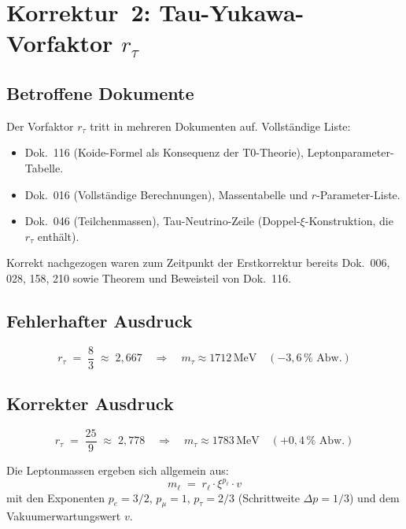 \section{\texorpdfstring{Korrektur~2: Tau-Yukawa-Vorfaktor $r_\tau$}{Korrektur 2: Tau-Yukawa-Vorfaktor r-tau}}

\subsection*{Betroffene Dokumente}

Der Vorfaktor $r_\tau$ tritt in mehreren Dokumenten auf. Vollständige Liste:
\begin{itemize}
  \item Dok.~116 (Koide-Formel als Konsequenz der T0-Theorie),
        Leptonparameter-Tabelle.
  \item Dok.~016 (Vollständige Berechnungen), Massentabelle und
        $r$-Parameter-Liste.
  \item Dok.~046 (Teilchenmassen), Tau-Neutrino-Zeile
        (Doppel-$\xi$-Konstruktion, die $r_\tau$ enthält).
\end{itemize}
Korrekt nachgezogen waren zum Zeitpunkt der Erstkorrektur bereits
Dok.~006, 028, 158, 210 sowie Theorem und Beweisteil von Dok.~116.

\subsection*{Fehlerhafter Ausdruck}

\begin{equation}
  r_\tau \;=\; \frac{8}{3} \;\approx\; 2{,}667
  \quad \Rightarrow \quad
  m_\tau \approx 1712\,\text{MeV} \quad (-3{,}6\,\% \text{ Abw.})
  \tag{alt -- falsch}
\end{equation}

\subsection*{Korrekter Ausdruck}

\begin{equation}
  \boxed{r_\tau \;=\; \frac{25}{9} \;\approx\; 2{,}778}
  \quad \Rightarrow \quad
  m_\tau \approx 1783\,\text{MeV} \quad (+0{,}4\,\% \text{ Abw.})
  \tag{190.2}
\end{equation}

Die Leptonmassen ergeben sich allgemein aus:
\begin{equation}
  m_\ell \;=\; r_\ell \cdot \xi^{p_\ell} \cdot v
  \tag{190.3}
\end{equation}
mit den Exponenten $p_e = 3/2$, $p_\mu = 1$, $p_\tau = 2/3$
(Schrittweite $\Delta p = 1/3$) und dem Vakuumerwartungswert $v$.

